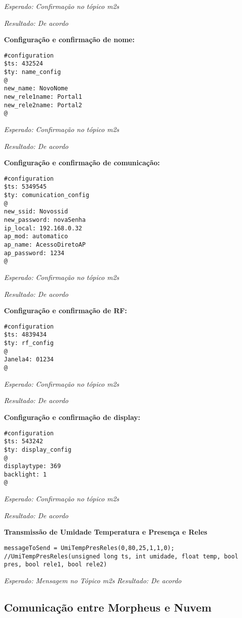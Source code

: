 \textit{Esperado: Confirmação no tópico \wmqtt{} m2s}

\textit{Resultado: De acordo}

\textbf{Configuração e confirmação de nome:}
\begin{lstlisting}
#configuration
$ts: 432524
$ty: name_config
@
new_name: NovoNome
new_rele1name: Portal1
new_rele2name: Portal2
@
\end{lstlisting}

\textit{Esperado: Confirmação no tópico \wmqtt{} m2s}

\textit{Resultado: De acordo}

\textbf{Configuração e confirmação de comunicação:}
\begin{lstlisting}
#configuration
$ts: 5349545
$ty: comunication_config
@
new_ssid: Novossid
new_password: novaSenha
ip_local: 192.168.0.32
ap_mod: automatico
ap_name: AcessoDiretoAP
ap_password: 1234
@
\end{lstlisting}

\textit{Esperado: Confirmação no tópico \wmqtt{} m2s}

\textit{Resultado: De acordo}

\textbf{Configuração e confirmação de RF:}
\begin{lstlisting}
#configuration
$ts: 4839434
$ty: rf_config
@
Janela4: 01234
@
\end{lstlisting}

\textit{Esperado: Confirmação no tópico \wmqtt{} m2s}

\textit{Resultado: De acordo}

\textbf{Configuração e confirmação de display:}
\begin{lstlisting}
#configuration
$ts: 543242
$ty: display_config
@
displaytype: 369
backlight: 1
@
\end{lstlisting}

\textit{Esperado: Confirmação no tópico \wmqtt{} m2s}

\textit{Resultado: De acordo}

\textbf{Transmissão de Umidade Temperatura e Presença e Reles}
\begin{lstlisting}
messageToSend = UmiTempPresReles(0,80,25,1,1,0);
//UmiTempPresReles(unsigned long ts, int umidade, float temp, bool pres, bool rele1, bool rele2)
\end{lstlisting}

\textit{Esperado: Mensagem no Tópico \wmqtt{} m2s}
\textit{Resultado: De acordo}


\subsection{Comunicação entre Morpheus e Nuvem}

